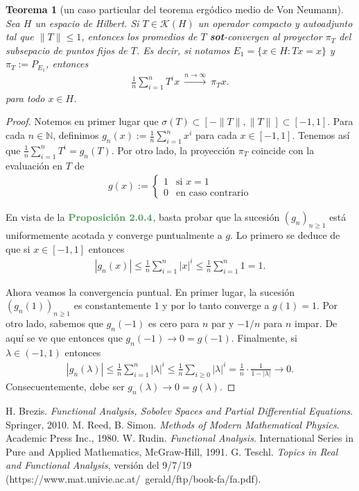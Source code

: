\documentclass[11pt]{report}
\theoremstyle{colored}
\newtheorem{theorem}{Teorema}[section]
\newcommand{\N}{\mathbb{N}}
\newcommand{\paint}[1]{\color{color}{#1}}
\newcommand{\tpaint}[1]{\paint{\textbf{#1}}}
\begin{document}
\begin{theorem}[un caso particular del teorema ergódico medio de Von Neumann] Sea $H$ un espacio de Hilbert. Si $T \in \mathscr{K}(H)$ un operador compacto y autoadjunto tal que $\|T\| \leq 1$, entonces los promedios de $T$ \textbf{sot}-convergen al proyector $\pi_T$ del subsepacio de puntos fijos de $T$. Es decir, si notamos $E_1 = \{x \in H : Tx = x\}$ y $\pi_T := P_{E_1}$, entonces
\begin{align*}
\frac{1}{n}\sum_{i=1}^{n}T^ix \ \xrightarrow{n \to \infty} \ \pi_Tx.
\end{align*}
para todo $x \in H$.
\end{theorem}
\begin{proof} Notemos en primer lugar que $\sigma(T) \subset [-\|T\|,\|T\|] \subset [-1,1]$. Para cada $n \in \N$, definimos $g_n(x) := \frac{1}{n}\sum_{i=1}^nx^i$ para cada $x \in [-1,1]$. Tenemos así que $\frac{1}{n}\sum_{i=1}^{n}T^i = g_n(T)$. Por otro lado, la proyección $\pi_T$ coincide con la evaluación en $T$ de 
\begin{align*}
g(x) := \begin{cases}
1 &\text{si $x = 1$}\\
0 &\text{en caso contrario}
\end{cases}
\end{align*}

En vista de la $\tpaint{Proposición 2.0.4}$, basta probar que la sucesión $(g_n)_{n \geq 1}$ está uniformemente acotada y converge puntualmente a $g$. Lo primero se deduce de que si $x \in [-1,1]$ entonces
\begin{align*}
|g_n(x)| \leq \frac{1}{n}\sum_{i=1}^n|x|^i \leq \frac{1}{n}\sum_{i=1}^n1 = 1.
\end{align*}

Ahora veamos la convergencia puntual. En primer lugar, la sucesión $(g_n(1))_{n \geq 1}$ es constantemente $1$ y por lo tanto converge a $g(1) = 1$. Por otro lado, sabemos que $g_n(-1)$ es cero para $n$ par y $-1/n$ para $n$ impar. De aquí se ve que entonces que $g_n(-1) \to 0 = g(-1)$. Finalmente, si $\lambda \in (-1,1)$ entonces
\begin{align*}
|g_n(\lambda)| \leq \frac{1}{n}\sum_{i=1}^n|\lambda|^i \leq \frac{1}{n}\sum_{i \geq 0}|\lambda|^i = \frac{1}{n} \cdot \frac{1}{1-|\lambda|} \to 0.
\end{align*}
Consecuentemente, debe ser $g_n(\lambda) \to 0 = g(\lambda)$.
\end{proof}

\begin{thebibliography}{}
 H. Brezis. \textit{Functional Analysis, Sobolev Spaces and Partial Differential Equations}. Springer, 2010.
 M. Reed, B. Simon. \textit{Methods of Modern Mathematical Physics}.  Academic Press Inc., 1980.
 W. Rudin. \textit{Functional Analysis}. International Series in Pure and Applied Mathematics, McGraw-Hill, 1991.
 G. Teschl. \textit{Topics in Real and Functional Analysis}, versión del 9/7/19 (https://www.mat.univie.ac.at/~gerald/ftp/book-fa/fa.pdf).

\end{thebibliography}
\end{document}
